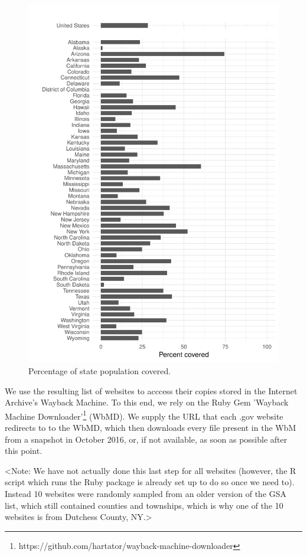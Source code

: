 \documentclass[11pt]{article}
\begin{document}
\begin{figure}[!ht]
	\centering
	\caption{Percentage of state population covered.}
	\includegraphics[width=0.9\linewidth,height=0.9\textheight]{figures/coverage_states.pdf}
\end{figure}

We use the resulting list of websites to acccess their copies stored in the Internet Archive's Wayback Machine. To this end, we rely on the Ruby Gem 'Wayback Machine Downloader'\footnote{https://github.com/hartator/wayback-machine-downloader} (WbMD). We supply the URL that each .gov website redirects to to the WbMD, which then downloads every file present in the WbM from a snapshot in October 2016, or, if not available, as soon as possible after this point.

<Note: We have not actually done this last step for all websites (however, the R script which runs the Ruby package is already set up to do so once we need to). Instead 10 websites were randomly sampled from an older version of the GSA list, which still contained counties and townships, which is why one of the 10 websites is from Dutchess County, NY.>
\end{document}
